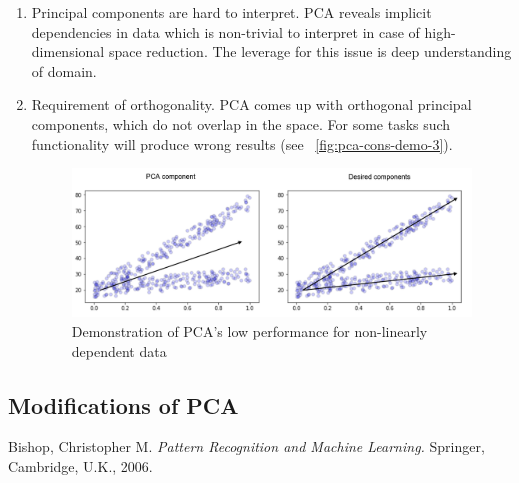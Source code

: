 \begin{enumerate}
	\item Principal components are hard to interpret.
	PCA reveals implicit dependencies in data which is non-trivial to interpret in case of high-dimensional space reduction. The leverage for this issue is deep understanding of domain.
	
	\item Requirement of orthogonality.
	PCA comes up with orthogonal principal components, which do not overlap in the space. For some tasks such functionality will produce wrong results (see ~\autoref{fig:pca-cons-demo-3}).
	
	\begin{figure}[h]
		\centering
		\includegraphics[scale=0.5]{img/non-orthogonal-components.png}
		\caption{\label{fig:pca-cons-demo-3}Demonstration of PCA's low performance for non-linearly dependent data}
	\end{figure}
	
\end{enumerate}

\subsection{Modifications of PCA}

\begin{thebibliography}{9}

	Bishop, Christopher M.
	\textit{Pattern Recognition
	and Machine Learning.} Springer, Cambridge, U.K., 2006.
	
\end{thebibliography}

